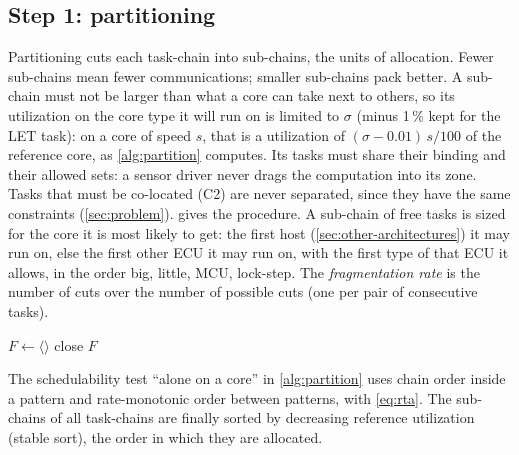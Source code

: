 \subsection{Step 1: partitioning}
\label{sec:partitioning}

Partitioning cuts each task-chain into sub-chains, the units of
allocation. Fewer sub-chains mean fewer communications; smaller sub-chains
pack better. A sub-chain must not be larger than what a core can take next
to others, so its utilization on the core type it will run on is limited
to $\sigma$ (minus 1\,\% kept for the LET task): on a core of speed $s$,
that is a utilization of $(\sigma-0.01)\,s/100$ of the reference core, as
\cref{alg:partition} computes. Its tasks must share their binding and
their allowed sets: a sensor driver never drags the computation into its
zone. Tasks that must be co-located (C2) are never separated, since they
have the same constraints (\cref{sec:problem}).  gives the procedure. A sub-chain of free
tasks is sized for the core it is most likely to get: the first host
(\cref{sec:other-architectures}) it may run on, else the first other ECU
it may run on, with the first type of that ECU it allows, in the order
big, little, MCU, lock-step. The \emph{fragmentation rate} is the
number of cuts over the number of possible cuts (one per pair of
consecutive tasks).

\begin{algorithm2e}[t]
\caption{\textsf{Partition}$(\xi,\sigma)$}
\label{alg:partition}
$F\gets\langle\rangle$ 
close $F$\;
\end{algorithm2e}

The schedulability test ``alone on a core'' in \cref{alg:partition} uses
chain order inside a pattern and rate-monotonic order between patterns,
with \cref{eq:rta}. The sub-chains of all task-chains are finally sorted by
decreasing reference utilization (stable sort), the order in which they are
allocated.

